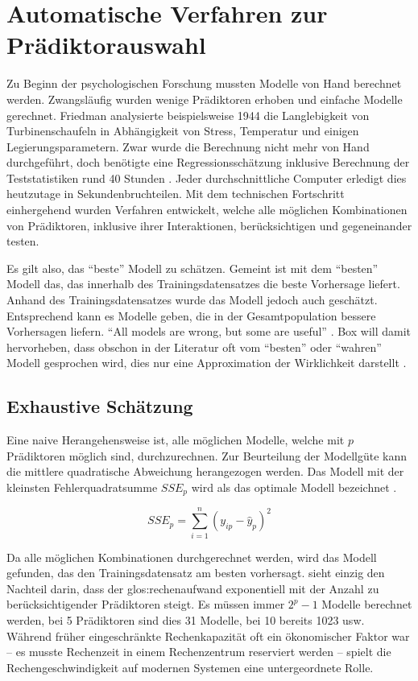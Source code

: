 \section{Automatische Verfahren zur Prädiktorauswahl}
Zu Beginn der psychologischen Forschung mussten Modelle von Hand berechnet werden. Zwangsläufig wurden wenige Prädiktoren erhoben und einfache Modelle gerechnet. 
Friedman analysierte beispielsweise 1944 die Langlebigkeit von Turbinenschaufeln in Abhängigkeit von Stress, Temperatur und einigen Legierungsparametern. 
Zwar wurde die Berechnung nicht mehr von Hand durchgeführt, doch benötigte eine Regressionsschätzung inklusive Berechnung der Teststatistiken rund 40 Stunden \cite[p.2]{armstrong2011illusions}. Jeder durchschnittliche Computer erledigt dies heutzutage in Sekundenbruchteilen. 
Mit dem technischen Fortschritt einhergehend wurden Verfahren entwickelt, welche alle möglichen Kombinationen von Prädiktoren, inklusive ihrer Interaktionen, berücksichtigen und gegeneinander testen.

Es gilt also, das ``beste'' Modell zu schätzen. 
Gemeint ist mit dem ``besten'' Modell das, das innerhalb des Trainingsdatensatzes die beste Vorhersage liefert. 
Anhand des Trainingsdatensatzes wurde das Modell jedoch auch geschätzt. Entsprechend kann es Modelle geben, die in der Gesamtpopulation bessere Vorhersagen liefern. 
``All models are wrong, but some are useful'' \cite[p.202]{box1979robustness}.
Box will damit hervorheben, dass obschon in der Literatur oft vom ``besten'' oder ``wahren'' Modell gesprochen wird, dies nur eine Approximation der Wirklichkeit darstellt \cite[p.172]{weakliem2004introduction}.

\subsection{Exhaustive Schätzung} 
Eine naive Herangehensweise ist, alle möglichen Modelle, welche mit $p$ Prädiktoren möglich sind, durchzurechnen. 
Zur Beurteilung der Modellgüte kann die mittlere quadratische Abweichung herangezogen werden.
Das Modell mit der kleinsten Fehlerquadratsumme $SSE_p$ wird als das  optimale Modell bezeichnet \cite[p. 6]{thompson1978selection}. 

\begin{equation}
SSE_p = \sum_{i=1}^n(y_{ip}-\hat y_{p})^2
\tag{Fehlerquadratsumme}
\end{equation}


Da alle möglichen Kombinationen durchgerechnet werden, wird das  Modell gefunden, das den Trainingsdatensatz am besten vorhersagt.
 sieht einzig den Nachteil darin, dass der \Gls{glos:rechenaufwand} exponentiell mit der Anzahl zu berücksichtigender Prädiktoren steigt. 
Es müssen immer $2^p-1$ Modelle berechnet werden, bei 5 Prädiktoren sind dies 31 Modelle, bei 10 bereits 1023 usw.
Während früher eingeschränkte Rechenkapazität oft ein ökonomischer Faktor war -- es musste Rechenzeit in einem Rechenzentrum reserviert werden -- spielt die Rechengeschwindigkeit auf modernen Systemen eine untergeordnete Rolle. 

